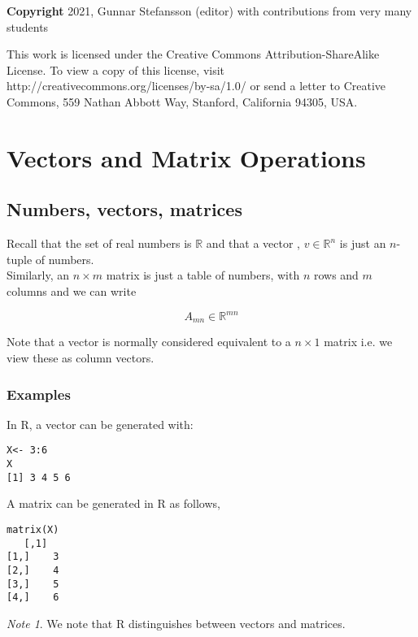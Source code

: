 \documentclass[12pt,a4paper]{article}
\theoremstyle{regla}
\theoremstyle{remark}
\newtheorem{notes}{Note}[section]
\theoremstyle{definition}
\theoremstyle{nonumberbreak}
\begin{document}
{\bf Copyright}
2021, Gunnar Stefansson (editor) with contributions from very many students

This work is licensed under the Creative Commons
Attribution-ShareAlike License. To view a copy of this license, visit
http://creativecommons.org/licenses/by-sa/1.0/ or send a letter to
Creative Commons, 559 Nathan Abbott Way, Stanford, California 94305,
USA.
\clearpage
\section{Vectors and Matrix Operations}
\subsection{Numbers, vectors, matrices}
\begin{fbox}
\begin{minipage}{0.97\textwidth}
Recall that the set of real numbers is $\mathbb{R}$ and that a vector , $v \in \mathbb{R}^n$ is just an $n$-tuple of numbers.\\

Similarly, an $n \times m$ matrix is just a table of numbers, with $n$ rows and $m$ columns and we can write 

$$A_{mn} \in \mathbb{R}^{mn}$$

Note that a vector is normally considered equivalent to a  $n\times 1$ matrix i.e. we view these as column vectors.

\end{minipage}
\end{fbox}
\subsubsection{Examples}
\begin{xmpl}
In R, a vector can be generated with:

\begin{lstlisting}
X<- 3:6
X
[1] 3 4 5 6
\end{lstlisting}

A matrix can be generated in R as follows,
\begin{lstlisting}
matrix(X)
   [,1]
[1,]    3
[2,]    4
[3,]    5
[4,]    6
\end{lstlisting}

\begin{notes}
We note that R distinguishes between vectors and matrices.
\end{notes}
\end{xmpl}
\end{document}
